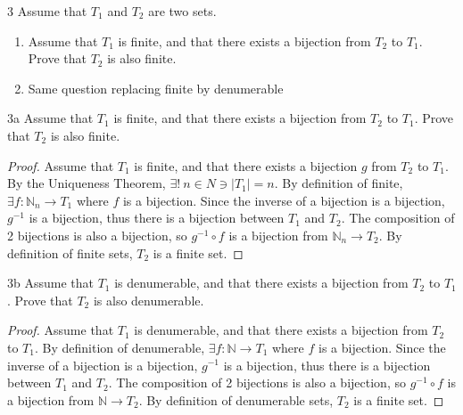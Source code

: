 \documentclass{article}
\newcommand{\N}{\mathbb{N}}
\begin{document}
\bigskip

\begin{PROB}{3}\label{Problem 3.}
    Assume that $T_1$ and $T_2$ are two sets.

    \begin{enumerate}
        \item Assume that $T_1$ is finite, and that there exists a bijection from $T_2$ to $T_1$. Prove that $T_2$ is also finite.
        \item Same question replacing finite by denumerable
    \end{enumerate} 
\end{PROB}
\begin{claim}{3a}\label{Claim 3a.}
    Assume that $T_1$ is finite, and that there exists a bijection from $T_2$ to $T_1$. Prove that $T_2$ is also finite.
\end{claim}
\begin{proof}
    Assume that $T_1$ is finite, and that there exists a bijection $g$ from $T_2$ to $T_1$. By the Uniqueness Theorem, $\exists! ~ n \in N \ni |T_1| = n$. By definition of finite, $\exists f : \N_n \to T_1$ where $f$ is a bijection. Since the inverse of a bijection is a bijection, $g^{-1}$ is a bijection, thus there is a bijection between $T_1$ and $T_2$. The composition of 2 bijections is also a bijection, so $g^{-1} \circ f$ is a bijection from $\N_n \to T_2$. By definition of finite sets, $T_2$ is a finite set.       
\end{proof}
\begin{claim}{3b}\label{Claim 3b.}
    Assume that $T_1$ is denumerable, and that there exists a bijection from $T_2$ to $T_1$. Prove that $T_2$ is also denumerable.
\end{claim}
\begin{proof}
    Assume that $T_1$ is denumerable, and that there exists a bijection from $T_2$ to $T_1$. By definition of denumerable, $\exists f : \N \to T_1$ where $f$ is a bijection. Since the inverse of a bijection is a bijection, $g^{-1}$ is a bijection, thus there is a bijection between $T_1$ and $T_2$. The composition of 2 bijections is also a bijection, so $g^{-1} \circ f$ is a bijection from $\N \to T_2$. By definition of denumerable sets, $T_2$ is a finite set.
\end{proof}

\bigskip
\end{document}
